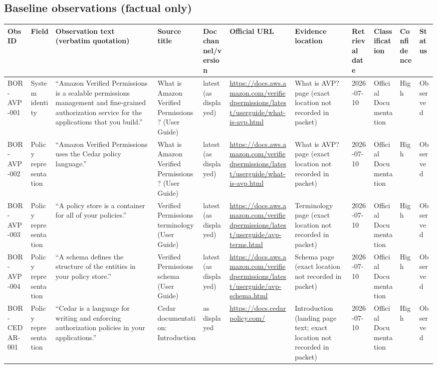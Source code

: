 \documentclass[11pt]{article}
\begin{document}
\subsection*{Baseline observations (factual only)}
\begin{longtable}{@{}L{0.95in}L{1.05in}L{2.05in}L{1.55in}L{0.95in}L{1.55in}L{1.10in}L{0.75in}L{0.95in}L{0.75in}L{0.8in}@{}}
\toprule
Obs ID & Field & Observation text (verbatim quotation) & Source title & Doc channel/version & Official URL & Evidence location & Retrieval date & Classification & Confidence & Status\\
\midrule
\endhead
BOR-AVP-001 & System identity & ``Amazon Verified Permissions is a scalable permissions management and fine-grained authorization service for the applications that you build.'' & What is Amazon Verified Permissions? (User Guide) & latest (as displayed) & \url{https://docs.aws.amazon.com/verifiedpermissions/latest/userguide/what-is-avp.html} & What is AVP? page (exact location not recorded in packet) & 2026-07-10 & Official Documentation & High & Observed\\
BOR-AVP-002 & Policy representation & ``Amazon Verified Permissions uses the Cedar policy language.'' & What is Amazon Verified Permissions? (User Guide) & latest (as displayed) & \url{https://docs.aws.amazon.com/verifiedpermissions/latest/userguide/what-is-avp.html} & What is AVP? page (exact location not recorded in packet) & 2026-07-10 & Official Documentation & High & Observed\\
BOR-AVP-003 & Policy representation & ``A policy store is a container for all of your policies.'' & Verified Permissions terminology (User Guide) & latest (as displayed) & \url{https://docs.aws.amazon.com/verifiedpermissions/latest/userguide/avp-terms.html} & Terminology page (exact location not recorded in packet) & 2026-07-10 & Official Documentation & High & Observed\\
BOR-AVP-004 & Policy representation & ``A schema defines the structure of the entities in your policy store.'' & Verified Permissions schema (User Guide) & latest (as displayed) & \url{https://docs.aws.amazon.com/verifiedpermissions/latest/userguide/avp-schema.html} & Schema page (exact location not recorded in packet) & 2026-07-10 & Official Documentation & High & Observed\\
BOR-CEDAR-001 & Policy representation & ``Cedar is a language for writing and enforcing authorization policies in your applications.'' & Cedar documentation: Introduction & as displayed & \url{https://docs.cedarpolicy.com/} & Introduction (landing page text; exact location not recorded in packet) & 2026-07-10 & Official Documentation & High & Observed\\

\end{longtable}
\end{document}
